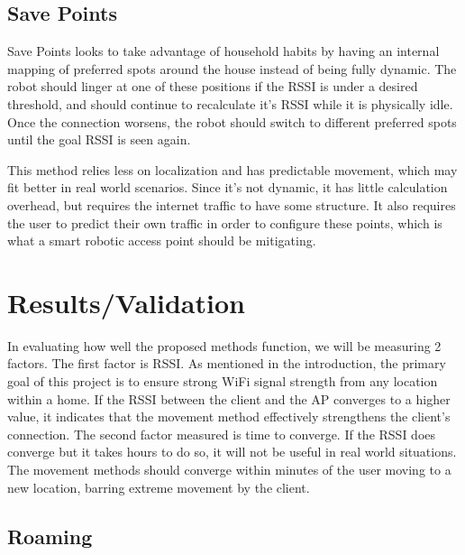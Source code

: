 \subsection{Save Points}
Save Points looks to take advantage of household habits by having an internal mapping of preferred spots around the house instead of being fully dynamic. The robot should linger at one of these positions if the RSSI is under a desired threshold, and should continue to recalculate it’s RSSI while it is physically idle. Once the connection worsens, the robot should switch to different preferred spots until the goal RSSI is seen again.\par
This method relies less on localization and has predictable movement, which may fit better in real world scenarios. Since it’s not dynamic, it has little calculation overhead, but requires the internet traffic to have some structure. It also requires the user to predict their own traffic in order to configure these points, which is what a smart robotic access point should be mitigating.


\section{Results/Validation}
In evaluating how well the proposed methods function, we will be measuring 2 factors. The first factor is RSSI. As mentioned in the introduction, the primary goal of this project is to ensure strong WiFi signal strength from any location within a home. If the RSSI between the client and the AP converges to a higher value, it indicates that the movement method effectively strengthens the client’s connection. The second factor measured is time to converge. If the RSSI does converge but it takes hours to do so, it will not be useful in real world situations. The movement methods should converge within minutes of the user moving to a new location, barring extreme movement by the client.  
\subsection{Roaming}

